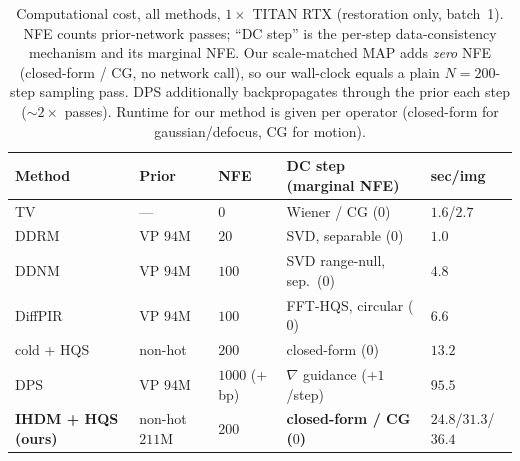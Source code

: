 \documentclass[11pt]{article}
\begin{document}
\begin{table}[h]
\centering
\caption{Computational cost, all methods, $1\times$ TITAN RTX (restoration only, batch~1). NFE
counts prior-network passes; ``DC step'' is the per-step data-consistency mechanism and its marginal
NFE. Our scale-matched MAP adds \emph{zero} NFE (closed-form / CG, no network call), so our wall-clock
equals a plain $N{=}200$-step sampling pass. DPS additionally backpropagates through the prior each
step ($\sim\!2\times$ passes). Runtime for our method is given per operator (closed-form for
gaussian/defocus, CG for motion).}
\label{tab:compute}
\begin{tabular}{lllll}
\toprule
Method & Prior & NFE & DC step (marginal NFE) & sec/img \\
\midrule
TV                 & ---            & $0$              & Wiener / CG ($0$)         & $1.6$/$2.7$ \\
DDRM               & VP $94$M       & $20$             & SVD, separable ($0$)      & $1.0$ \\
DDNM               & VP $94$M       & $100$            & SVD range-null, sep.\ ($0$) & $4.8$ \\
DiffPIR            & VP $94$M       & $100$            & FFT-HQS, circular ($0$)   & $6.6$ \\
cold + HQS         & non-hot        & $200$            & closed-form ($0$)         & $13.2$ \\
DPS                & VP $94$M       & $1000$ ($+$bp)   & $\nabla$ guidance ($+1$/step) & $95.5$ \\
\textbf{IHDM + HQS (ours)} & non-hot $211$M & $200$    & \textbf{closed-form / CG ($0$)} & $24.8$/$31.3$/$36.4$ \\
\bottomrule
\end{tabular}
\end{table}
\end{document}
